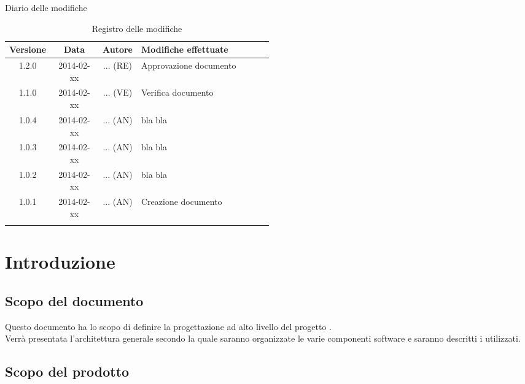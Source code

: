 
\newpage
Diario delle modifiche
\begin{center}
\begin{longtable}{|c|c|c|p{0.5\linewidth}|}
\toprule
\textbf{Versione} & \textbf{Data} & \textbf{Autore} & \textbf{Modifiche effettuate}\\

\midrule
1.2.0 & 2014-02-xx & ... (RE) & Approvazione documento\\
\midrule
1.1.0 & 2014-02-xx & ... (VE) & Verifica documento\\
\midrule
1.0.4 & 2014-02-xx & ... (AN) & bla bla\\
\midrule
1.0.3 & 2014-02-xx & ... (AN) & bla bla\\
\midrule
1.0.2 & 2014-02-xx & ... (AN) & bla bla\\
\midrule
1.0.1 & 2014-02-xx & ... (AN) & Creazione documento\\

\bottomrule
\caption{Registro delle modifiche}
\label{tab:changelog}
\end{longtable}
\end{center}

\newpage
\tableofcontents


\newpage
\section{Introduzione}
\label{1.0}
\subsection{Scopo del documento}
\label{1.1}
Questo documento ha lo scopo di definire la progettazione ad alto livello del progetto \textbf{\Progetto{}}.\\
Verrà presentata l'architettura generale secondo la quale saranno organizzate le varie 
componenti software e saranno descritti i  utilizzati.

\subsection{Scopo del prodotto}
\label{1.2}
\Prodotto{}

